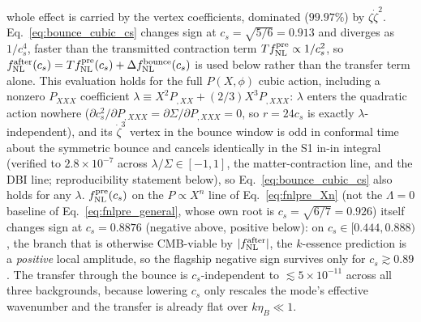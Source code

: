 \documentclass[aps,prd,twocolumn,superscriptaddress,nofootinbib,longbibliography]{revtex4-2}
\newcommand{\fnl}{f_{\rm NL}}
\begin{document}
whole effect is carried by the vertex coefficients, dominated
($99.97\%$) by $\zeta\dot\zeta^2$. Eq.~\eqref{eq:bounce_cubic_cs}
changes sign at $c_s=\sqrt{5/6}=0.913$ and diverges as $1/c_s^4$,
faster than the transmitted contraction term $T\fnl^{\rm pre}\propto
1/c_s^2$, so $\fnl^{\rm after}(c_s)=T\fnl^{\rm pre}(c_s)+\Delta\fnl^{\rm
bounce}(c_s)$ is used below rather than the transfer term alone. This
evaluation holds for the full $P(X,\phi)$ cubic action, including a
nonzero $P_{XXX}$ coefficient $\lambda\equiv X^2P_{,XX}+(2/3)X^3P_{,XXX}$:
$\lambda$ enters the quadratic action nowhere
($\partial c_s^2/\partial P_{,XXX}=\partial\Sigma/\partial P_{,XXX}=0$, so
$r=24c_s$ is exactly $\lambda$-independent), and its $\dot\zeta^3$ vertex
in the bounce window is odd in conformal time about the symmetric bounce
and cancels identically in the S1 in-in integral (verified to
$2.8\times10^{-7}$ across $\lambda/\Sigma\in[-1,1]$, the
matter-contraction line, and the DBI line;
reproducibility statement below), so Eq.~\eqref{eq:bounce_cubic_cs} also
holds for any $\lambda$.
$\fnl^{\rm pre}(c_s)$
on the $P\propto X^n$ line of Eq.~\eqref{eq:fnlpre_Xn} (not the
$\Lambda=0$ baseline of Eq.~\eqref{eq:fnlpre_general}, whose own root is
$c_s=\sqrt{6/7}=0.926$)
itself changes sign at $c_s=0.8876$ (negative above, positive below):
on $c_s\in[0.444,0.888)$, the branch that is otherwise CMB-viable by
$|\fnl^{\rm after}|$, the $k$-essence prediction is a \emph{positive}
local amplitude, so the flagship negative sign survives only for
$c_s\gtrsim0.89$. The transfer through the
bounce is $c_s$-independent to $\lesssim5\times10^{-11}$ across all
three backgrounds, because lowering $c_s$ only rescales the mode's
effective wavenumber and the transfer is already flat over
$k\eta_B\ll1$.
\end{document}

